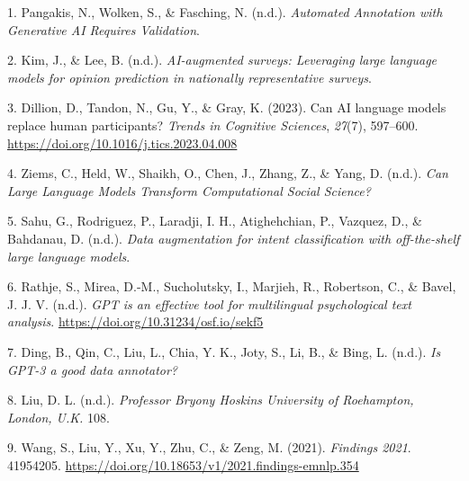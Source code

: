\documentclass[
  10pt,
  letterpaper,
  DIV=11,
  numbers=noendperiod]{scrartcl}
\newlength{\cslhangindent}
\newlength{\cslentryspacingunit} %
\newenvironment{CSLReferences}[2] %
 {%
  \setlength{\parindent}{0pt}
  \ifodd #1
  \let\oldpar\par
  \def\par{\hangindent=\cslhangindent\oldpar}
  \fi
  \setlength{\parskip}{#2\cslentryspacingunit}
 }%
 {}
\begin{document}
\hypertarget{refs}{}
\begin{CSLReferences}{1}{0}
\leavevmode{}%
1. Pangakis, N., Wolken, S., \& Fasching, N. (n.d.). \emph{Automated
Annotation with Generative AI Requires Validation}.

\leavevmode{}%
2. Kim, J., \& Lee, B. (n.d.). \emph{AI-augmented surveys: Leveraging
large language models for opinion prediction in nationally
representative surveys}.

\leavevmode{}%
3. Dillion, D., Tandon, N., Gu, Y., \& Gray, K. (2023). Can AI language
models replace human participants? \emph{Trends in Cognitive Sciences},
\emph{27}(7), 597--600. \url{https://doi.org/10.1016/j.tics.2023.04.008}

\leavevmode{}%
4. Ziems, C., Held, W., Shaikh, O., Chen, J., Zhang, Z., \& Yang, D.
(n.d.). \emph{Can Large Language Models Transform Computational Social
Science?}

\leavevmode{}%
5. Sahu, G., Rodriguez, P., Laradji, I. H., Atighehchian, P., Vazquez,
D., \& Bahdanau, D. (n.d.). \emph{Data augmentation for intent
classification with off-the-shelf large language models}.

\leavevmode{}%
6. Rathje, S., Mirea, D.-M., Sucholutsky, I., Marjieh, R., Robertson,
C., \& Bavel, J. J. V. (n.d.). \emph{GPT is an effective tool for
multilingual psychological text analysis}.
\url{https://doi.org/10.31234/osf.io/sekf5}

\leavevmode{}%
7. Ding, B., Qin, C., Liu, L., Chia, Y. K., Joty, S., Li, B., \& Bing,
L. (n.d.). \emph{Is GPT-3 a good data annotator?}

\leavevmode{}%
8. Liu, D. L. (n.d.). \emph{Professor Bryony Hoskins University of
Roehampton, London, U.K.} 108.

\leavevmode{}%
9. Wang, S., Liu, Y., Xu, Y., Zhu, C., \& Zeng, M. (2021).
\emph{Findings 2021}. 41954205.
\url{https://doi.org/10.18653/v1/2021.findings-emnlp.354}

\end{CSLReferences}
\end{document}
